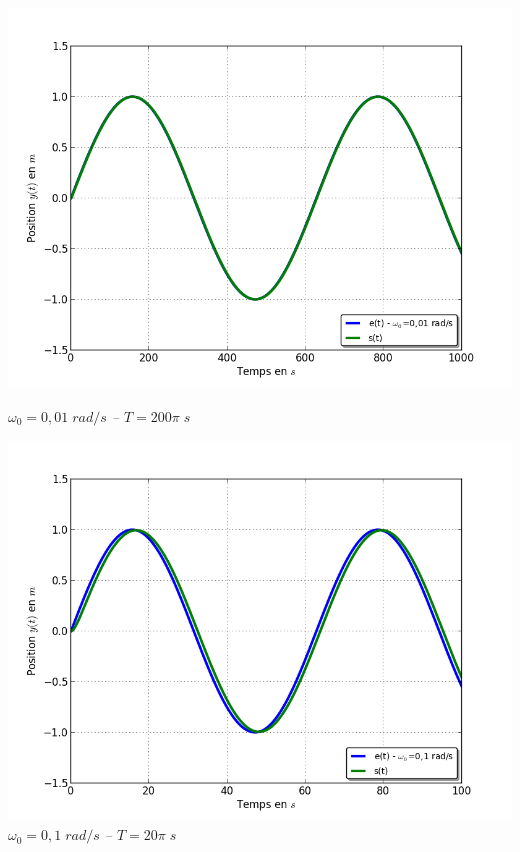 \documentclass[10pt,oneside]{article}
\begin{document}
\begin{minipage}[c]{.24\linewidth}
\begin{center}
\includegraphics[width=\textwidth]{png/sinus_om001.png}

\textit{$\omega_0 =  0,01\; rad/s $ -- $T = 200 \pi \; s$}
\end{center}
\end{minipage}\hfill
\begin{minipage}[c]{.24\linewidth}
\begin{center}
\includegraphics[width=\textwidth]{png/sinus_om01}
\textit{$\omega_0 =  0,1\; rad/s $ -- $ T = 20 \pi \; s$}
\end{center}
\end{minipage}\hfill
\end{document}
